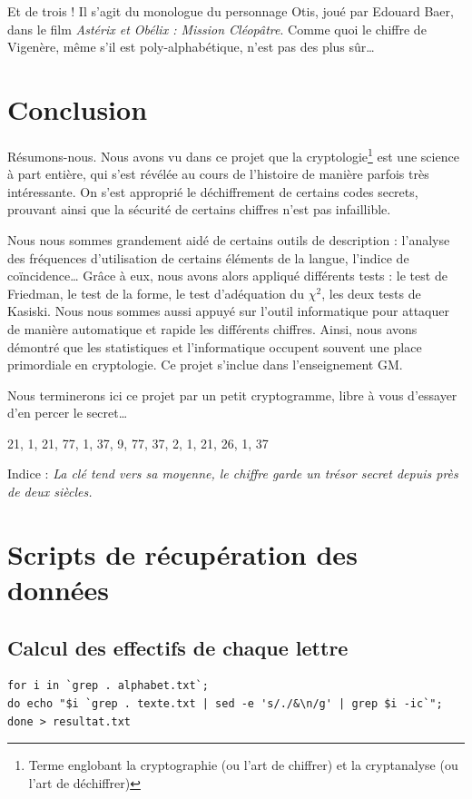 \documentclass[a4paper, titlepage]{livret}
\begin{document}
Et de trois !
Il s'agit du monologue du personnage Otis, joué par Edouard Baer, dans le film \emph{Astérix et Obélix : Mission Cléopâtre}.
Comme quoi le chiffre de Vigenère, même s'il est poly-alphabétique, n'est pas des plus sûr…

\chapter*{Conclusion}
Résumons-nous.
Nous avons vu dans ce projet que la cryptologie\footnote{Terme englobant la cryptographie (ou l'art de chiffrer) et la cryptanalyse (ou l'art de déchiffrer)} est une science à part entière, qui s'est révélée au cours de l'histoire de manière parfois très intéressante.
On s'est approprié le déchiffrement de certains codes secrets, prouvant ainsi que la sécurité de certains chiffres n'est pas infaillible.

Nous nous sommes grandement aidé de certains outils de description : l'analyse des fréquences d'utilisation de certains éléments de la langue, l'indice de coïncidence…
Grâce à eux, nous avons alors appliqué différents tests : le test de Friedman, le test de la forme, le test d'adéquation du $\chi^{2}$, les deux tests de Kasiski.
Nous nous sommes aussi appuyé sur l'outil informatique pour attaquer de manière automatique et rapide les différents chiffres.
Ainsi, nous avons démontré que les statistiques et l'informatique occupent souvent une place primordiale en cryptologie.
Ce projet s'inclue dans l'enseignement GM.

Nous terminerons ici ce projet par un petit cryptogramme, libre à vous d'essayer d'en percer le secret…

\begin{center}
21, 1, 21, 77, 1, 37, 9, 77, 37, 2, 1, 21, 26, 1, 37

Indice : \emph{La clé tend vers sa moyenne, le chiffre garde un trésor secret depuis près de deux siècles.}
\end{center}


\appendix

\chapter{Scripts de récupération des données}
\section{Calcul des effectifs de chaque lettre}
\begin{verbatim}
for i in `grep . alphabet.txt`; 
do echo "$i `grep . texte.txt | sed -e 's/./&\n/g' | grep $i -ic`";
done > resultat.txt
\end{verbatim}
\end{document}

